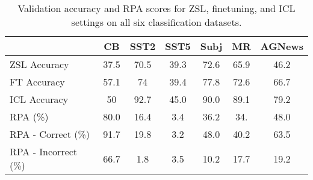\begin{table*}[tb]
  \centering
  \setlength{\tabcolsep}{7pt}
  \begin{tabular}{l | c c c c c c}
  \toprule
  & \textbf{CB} & \textbf{SST2} & \textbf{SST5} & \textbf{Subj} & \textbf{MR} & \textbf{AGNews} \\ 
  \midrule
   ZSL Accuracy & 37.5 & 70.5 & 39.3 & 72.6 & 65.9 & 46.2 \\
   FT Accuracy & 57.1 & 74 & 39.4 & 77.8 & 72.6 & 66.7 \\
   ICL Accuracy & 50 & 92.7 & 45.0 & 90.0 & 89.1 & 79.2 \\
  \midrule
  RPA (\%)           & 80.0 & 16.4 & 3.4 & 36.2 & 34. & 48.0 \\
  RPA - Correct (\%) & 91.7 & 19.8 & 3.2 & 48.0 & 40.2 & 63.5 \\
  RPA - Incorrect (\%) & 66.7 & 1.8 & 3.5 & 10.2 & 17.7 & 19.2 \\
  \end{tabular}
  \caption{Validation accuracy and RPA scores for ZSL, finetuning, and ICL settings on all six classification datasets.}
  \label{tab:acc_rpa}
\end{table*}